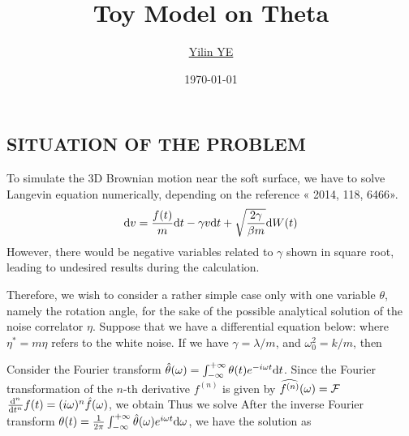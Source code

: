 \documentclass[article,11pt]{elegantpaper}
\title{Toy Model on Theta}
\author{\href{https://yiliny.github.io/yiliny/}{{Yilin YE}}}
\date{\today} %
\begin{document}
\maketitle

\subsection{SITUATION OF THE PROBLEM}

To simulate the 3D Brownian motion near the soft surface, we have to solve Langevin equation numerically, depending on the reference « 2014, 118, 6466». 
$$ \mrm{d}v = \frac{f(t)}{m} \mrm{d}t - \gamma v \mrm{d}t + \sqrt{\frac{2\gamma}{\beta m}} \mrm{d}W(t) $$
However, there would be negative variables related to $\gamma$ shown in square root, leading to undesired results during the calculation.

Therefore, we wish to consider a rather simple case only with one variable $\theta$, namely the rotation angle, for the sake of the possible analytical solution of the noise correlator $\eta$. Suppose that we have a differential equation below:
where $\eta^\ast = m \eta$ refers to the white noise. If we have $\gamma = \lambda / m$, and $\omega_0^2 = k/m$, then




Consider the Fourier transform $\hat\theta(\omega) = \int_{-\infty}^{+\infty} \theta(t) e^{-i\omega t} \mrm{d} t$. Since the Fourier transformation of the $n$-th derivative $f^{(n)}$ is given by $ \widehat{f^{(n)}} (\omega) = \cal{F}$ $\dv[n]{}{t} f(t) = (i \omega)^n \hat{f}(\omega)$, we obtain 
Thus we solve
After the inverse Fourier transform $\theta(t)= \frac{1}{2\pi} \int_{-\infty}^{+\infty} \hat\theta(\omega) e^{i\omega t} \mrm{d}\omega$, we have the solution as
\end{document}

